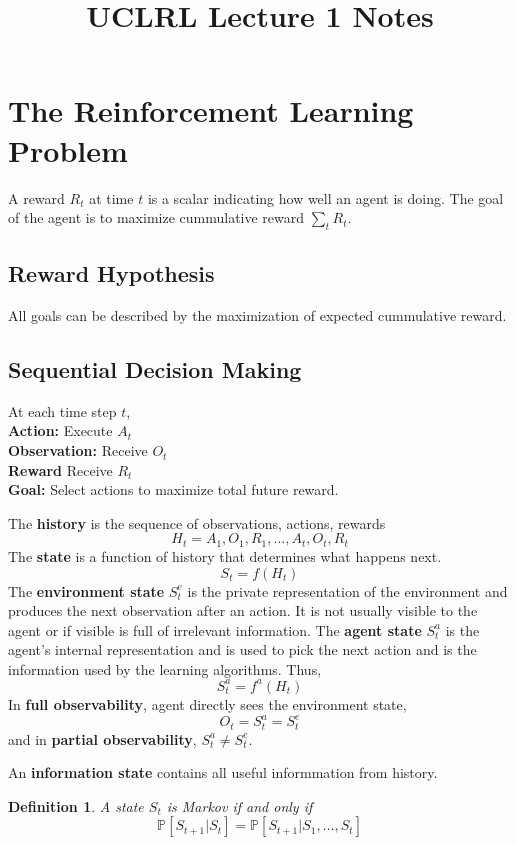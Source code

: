 \documentclass[a4paper,10pt]{article}
\title{UCLRL Lecture 1 Notes}
\author{}
\date{}
\newtheorem{defn}{Definition}
\begin{document}
\maketitle

\section{The Reinforcement Learning Problem}

A reward $R_t$ at time $t$ is a scalar indicating how well an agent is doing. The goal of the agent is to maximize cummulative reward $\sum_t R_t$.

\subsection{Reward Hypothesis}

All goals can be described by the maximization of expected cummulative reward.

\subsection{Sequential Decision Making}

At each time step $t$, 
\\
{\bf Action:} Execute $A_t$
\\
{\bf Observation:} Receive $O_t$
\\
{\bf Reward} Receive $R_t$
\\
{\bf Goal:} Select actions to maximize total future reward.

The {\bf history} is the sequence of observations, actions, rewards 
$$
H_t = A_1, O_1, R_1, \ldots, A_t, O_t, R_t
$$
The {\bf state} is a function of history that determines what happens next.
$$
S_t = f(H_t)
$$
The {\bf environment state} $S_t^e$ is the private representation of the environment and produces the next observation after an action. It is not  usually visible to the agent or if visible is full of irrelevant information. The {\bf agent state} $S_t^a$ is the agent's internal representation and is used to pick the next action and is the information used by the learning algorithms. Thus, 
$$
S_t^a = f^a(H_t)
$$
In {\bf full observability}, agent directly sees the environment state,
$$
O_t = S_t^a = S_t^e
$$ and in {\bf partial observability}, $S_t^a \ne S_t^e$.

An {\bf information state} contains all useful informmation from history. 

\begin{defn}
 A state $S_t$ is Markov if and only if 
 $$
 \mathbb{P}\left[S_{t+1} | S_t\right] = \mathbb{P}\left[S_{t+1} | S_1, \ldots, S_t\right]
 $$
\end{defn}
\end{document}
